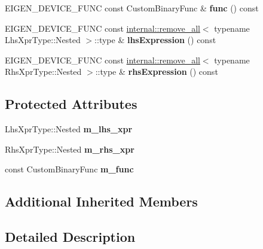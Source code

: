 \begin{DoxyCompactItemize}
E\+I\+G\+E\+N\+\_\+\+D\+E\+V\+I\+C\+E\+\_\+\+F\+U\+NC const Custom\+Binary\+Func \& {\bfseries func} () const
\item 
\mbox{\label{class_eigen_1_1_tensor_custom_binary_op_ab47190f09e2a7a0c2079d15a8d1a6adb}} 
E\+I\+G\+E\+N\+\_\+\+D\+E\+V\+I\+C\+E\+\_\+\+F\+U\+NC const \hyperlink{struct_eigen_1_1internal_1_1remove__all}{internal\+::remove\+\_\+all}$<$ typename Lhs\+Xpr\+Type\+::\+Nested $>$\+::type \& {\bfseries lhs\+Expression} () const
\item 
\mbox{\label{class_eigen_1_1_tensor_custom_binary_op_a793cd481b5c35f1b4f53fe34ee6151ed}} 
E\+I\+G\+E\+N\+\_\+\+D\+E\+V\+I\+C\+E\+\_\+\+F\+U\+NC const \hyperlink{struct_eigen_1_1internal_1_1remove__all}{internal\+::remove\+\_\+all}$<$ typename Rhs\+Xpr\+Type\+::\+Nested $>$\+::type \& {\bfseries rhs\+Expression} () const
\end{DoxyCompactItemize}
\subsection*{Protected Attributes}
\begin{DoxyCompactItemize}
\item 
\mbox{\label{class_eigen_1_1_tensor_custom_binary_op_ad486000a59fefd059882d208fa7923e1}} 
Lhs\+Xpr\+Type\+::\+Nested {\bfseries m\+\_\+lhs\+\_\+xpr}
\item 
\mbox{\label{class_eigen_1_1_tensor_custom_binary_op_aed99f1c46e82f3eee72ef2647a5ea66e}} 
Rhs\+Xpr\+Type\+::\+Nested {\bfseries m\+\_\+rhs\+\_\+xpr}
\item 
\mbox{\label{class_eigen_1_1_tensor_custom_binary_op_a0cb9a69b632ca63e0fc649ea6c8f8f23}} 
const Custom\+Binary\+Func {\bfseries m\+\_\+func}
\end{DoxyCompactItemize}
\subsection*{Additional Inherited Members}


\subsection{Detailed Description}
